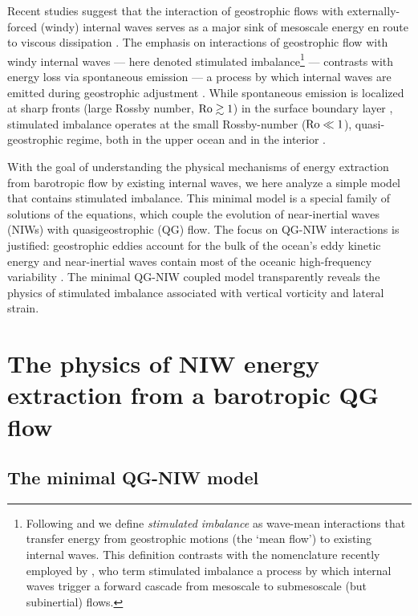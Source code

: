 \documentclass{jfm}
\begin{document}
Recent studies suggest that the interaction
of geostrophic flows with externally-forced (windy) internal waves serves
as a major sink of mesoscale energy en route to viscous dissipation
\citep{xie_vanneste2015,taylor_straub2016,wagner_young2016,barkan_etal2016}.
The emphasis on interactions of geostrophic flow with windy internal waves ---
here denoted stimulated imbalance\footnote{Following \cite{xie_vanneste2015} and
\cite{wagner_young2016} we define
\textit{stimulated imbalance} as wave-mean interactions that transfer energy from
geostrophic motions (the `mean flow') to existing internal
waves. This definition contrasts with the nomenclature recently employed by
\cite{barkan_etal2016}, who term stimulated imbalance a process by which
internal waves trigger a forward cascade from mesoscale to submesoscale (but
subinertial) flows.} ---
contrasts with energy loss via spontaneous emission --- a process
by which internal waves are emitted during geostrophic adjustment
\citep[e.g., ][]{shakespeare_hogg2017}. While spontaneous emission is localized
at sharp fronts (large Rossby number, $\mathrm{Ro}\gtrsim 1$) in the surface boundary
layer \citep[e.g., ][]{shakespeare_hogg2017}, stimulated imbalance operates at
the small Rossby-number ($\mathrm{Ro}\ll 1$), quasi-geostrophic regime, both in the upper
ocean and in the interior \citep[e.g., ][]{xie_vanneste2015}.

With the goal of understanding the physical mechanisms of energy extraction from
barotropic flow by existing internal waves, we here analyze a
simple model that contains stimulated imbalance. This minimal model is a special
family of solutions of the \cite{xie_vanneste2015} equations, which couple the
evolution of near-inertial waves (NIWs) with quasigeostrophic (QG) flow. The
focus on QG-NIW interactions is justified:  geostrophic eddies account for the
bulk of the ocean's eddy kinetic energy \cite[$90\%$,][]{ferrari_wunsch2009} and
near-inertial waves contain most of the oceanic high-frequency variability
\citep{alford_etal2016}. The minimal QG-NIW coupled model transparently reveals
the physics of stimulated imbalance associated with vertical vorticity and lateral strain.


\section{The physics of NIW energy extraction from a barotropic QG flow}

\subsection{The \cite{xie_vanneste2015} minimal QG-NIW model}
\end{document}
